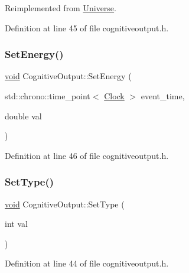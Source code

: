 Reimplemented from \mbox{\hyperlink{class_universe_aa22202ae740eb1355529afcb13285e91}{Universe}}.



Definition at line 45 of file cognitiveoutput.\+h.

\mbox{\label{class_cognitive_output_acc16ca3521689776ecd68255ece1e671}} 
\subsubsection{\texorpdfstring{Set\+Energy()}{SetEnergy()}}
{\footnotesize\ttfamily \mbox{\hyperlink{glad_8h_a950fc91edb4504f62f1c577bf4727c29}{void}} Cognitive\+Output\+::\+Set\+Energy (\begin{DoxyParamCaption}\item[{std\+::chrono\+::time\+\_\+point$<$ \mbox{\hyperlink{universe_8h_a0ef8d951d1ca5ab3cfaf7ab4c7a6fd80}{Clock}} $>$}]{event\+\_\+time,  }\item[{double}]{val }\end{DoxyParamCaption})\hspace{0.3cm}{\ttfamily [inline]}}



Definition at line 46 of file cognitiveoutput.\+h.

\mbox{\label{class_cognitive_output_ac76f41ab3b65ea466e9e2999270f2e5a}} 
\subsubsection{\texorpdfstring{Set\+Type()}{SetType()}}
{\footnotesize\ttfamily \mbox{\hyperlink{glad_8h_a950fc91edb4504f62f1c577bf4727c29}{void}} Cognitive\+Output\+::\+Set\+Type (\begin{DoxyParamCaption}\item[{int}]{val }\end{DoxyParamCaption})\hspace{0.3cm}{\ttfamily [inline]}}



Definition at line 44 of file cognitiveoutput.\+h.

\mbox{\label{class_cognitive_output_aae27d114676c68e02ae6e7ae36326ba8}} 
